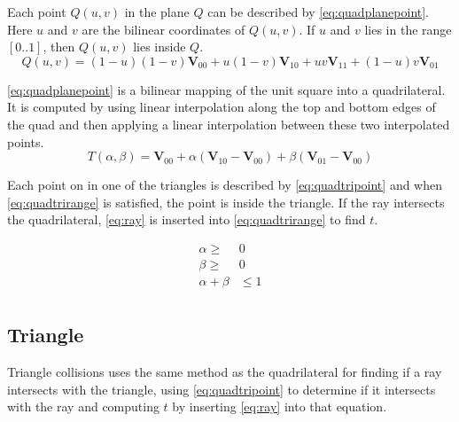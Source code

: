 \documentclass[a4paper, 12pt]{report}
\begin{document}
Each point $ Q(u, v) $ in the plane $ Q $ can be described by \autoref{eq:quadplanepoint}.
Here $ u $ and $ v $ are the bilinear coordinates of $Q(u,v)$. 
If $ u $ and $ v $ lies in the range $ [0 .. 1] $, then $ Q(u,v) $ lies inside $ Q $.\\

\begin{equation} \label{eq:quadplanepoint}
Q(u,v) = (1 - u) (1 - v) \mathbf{V}_{00} + u (1 - v) \mathbf{V}_{10} + uv\mathbf{V}_{11} + (1 - u) v \mathbf{V}_{01}
\end{equation}

\autoref{eq:quadplanepoint} is a bilinear mapping of the unit square into a quadrilateral.
It is computed by using linear interpolation along the top and bottom edges of the quad and then applying a linear interpolation between these two interpolated points.\\

\begin{equation}
\label{eq:quadtripoint}
T(\alpha, \beta) = \mathbf{V}_{00} + \alpha ( \mathbf{V}_{10} - \mathbf{V}_{00}) + \beta (\mathbf{V}_{01} - \mathbf{V}_{00})
\end{equation}

Each point on in one of the triangles is described by \autoref{eq:quadtripoint} and when \autoref{eq:quadtrirange} is satisfied, the point is inside the triangle.
If the ray intersects the quadrilateral, \autoref{eq:ray} is inserted into \autoref{eq:quadtrirange} to find $t$.

\begin{subequations} \label{eq:quadtrirange}
\begin{align}
\alpha \ge& 0\\
\beta \ge& 0\\
\alpha + \beta& \le 1\\
\end{align}
\end{subequations}

\subsection{Triangle}
Triangle collisions uses the same method as the quadrilateral for finding if a ray intersects with the triangle, using \autoref{eq:quadtripoint} to determine if it intersects with the ray and computing $t$ by inserting \autoref{eq:ray} into that equation.

\end{document}
